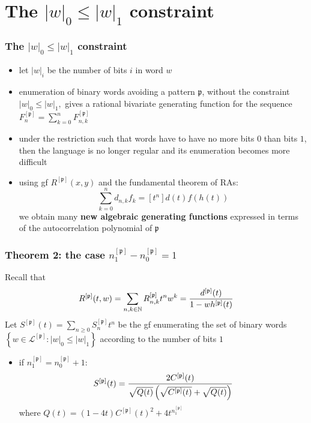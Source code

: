 \documentclass{beamer}
\begin{document}
\iffalse
\begin{frame}\frametitle{A Lemma}

 Let $\mathfrak{p}$ be  a Riordan pattern. Then the Riordan array ${{R}^{[\mathfrak{p}]}}$ is characterized by the  $A$-matrix
defined by the following relation:
$$R_{n+1,k+1}^{[\mathfrak{p}]}=R_{n,k}^{[\mathfrak{p}]}
+R_{n+1,k+2}^{[\mathfrak{p}]}-R_{n+1-n_1^{\mathfrak{p}},k+1+n_0^{\mathfrak{p}}-n_1^{\mathfrak{p}}}^{[\mathfrak{p}]} +$$
$$- \sum_{i\geq 1} c_{2i}\left(  R_{n+1-i,k+1}^{[\mathfrak{p}]} -R_{n-i,k}^{[\mathfrak{p}]} -R_{n+1-i,k+2}^{[\mathfrak{p}]} \right),$$
where  the  $c_i$ are given by the autocorrelation vector of
$\mathfrak{p}.$
\end{frame}
\fi

\section{The $|w|_{0}\leq |w|_{1}$ constraint}

\begin{frame}\frametitle{The $|w|_{0}\leq |w|_{1}$ constraint}
\begin{itemize}
\item let $|w|_{i}$ be the number of bits $i$ in word $w$
\item enumeration of binary words avoiding a pattern $\mathfrak{p}$, without the
constraint $|w|_0\leq |w|_1,$ gives a rational bivariate generating function
for the sequence $F^{[\mathfrak{p}]}_n=\sum_{k=0}^nF_{n,k}^{[\mathfrak{p}]}$
\item under the restriction such that words have to have no more bits $0$ than
bits $1$, then the language is no longer regular and its enumeration becomes
more difficult
\item using gf $R^{[\mathfrak{p}]}(x,y)$ and the fundamental theorem of RAs:
$$\sum_{k=0}^n d_{n,k}f_k=[t^n]d(t)f(h(t)) $$ we obtain many {\bf \red new
algebraic generating functions} expressed in terms of the autocorrelation
polynomial of  $\mathfrak{p}$
\end{itemize}
\end{frame}

\begin{frame}\frametitle{Theorem 2: the case $n_1^{[\mathfrak{p}]}-n_0^{[\mathfrak{p}]}=1$}
Recall that 
\begin{displaymath}
    R^{[\mathfrak{p}]}(t,w)=\sum_{n,k\in\mathbb{N}} R_{n, k}^{[\mathfrak{p}]}t^n
    w^k={d^{[\mathfrak{p}]}(t) \over 1-wh^{[\mathfrak{p}]}(t)}
\end{displaymath}
Let $S^{[\mathfrak{p}]}(t)=\sum_{n\geq 0}S_n^{[\mathfrak{p}]}t^n$ be the gf
enumerating the set of binary words $\left\lbrace
w\in\mathcal{L}^{[\mathfrak{p}]} : |w|_0\leq |w|_1\right\rbrace$ according to
the number of bits $1$
\begin{itemize}
\item if $n_1^{[\mathfrak{p}]}=n_0^{[\mathfrak{p}]}+1:$
$$S^{[\mathfrak{p}]}(t)={2C^{[\mathfrak{p}]}(t) \over \sqrt{Q(t)}\left(\sqrt{C^{[\mathfrak{p}]}(t)}+ \sqrt{Q(t)} \right)} $$
    where $Q(t)={(1-4t)C^{[\mathfrak{p}]}(t)^2+4t^{n_1^{[\mathfrak{p}]}}}$
\end{itemize}
\end{frame}
\end{document}
